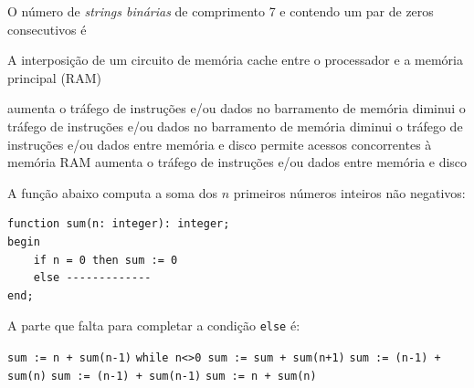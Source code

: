 \documentclass[12pt, addpoints]{exam}
\begin{document}
\begin{questions}
\question
O número de \textit{strings binárias} de comprimento 7 e contendo um par de zeros consecutivos é

\begin{choices}
\end{choices}

\question
A interposição de um circuito de memória cache entre o processador e a memória principal (RAM)
\begin{choices}
\choice aumenta o tráfego de instruções e/ou dados no barramento de memória
\choice diminui o tráfego de instruções e/ou dados no barramento de memória
\choice diminui o tráfego de instruções e/ou dados entre memória e disco
\choice permite acessos concorrentes à memória RAM
\choice aumenta o tráfego de instruções e/ou dados entre memória e disco
\end{choices}

\question
A função abaixo computa a soma dos \( n \) primeiros números inteiros não negativos:

\begin{verbatim}
function sum(n: integer): integer;
begin
    if n = 0 then sum := 0
    else -------------
end;
\end{verbatim}

A parte que falta para completar a condição \texttt{else} é:
\begin{choices}
\choice \texttt{sum := n + sum(n-1)}
\choice \texttt{while n<>0 sum := sum + sum(n+1)}
\choice \texttt{sum := (n-1) + sum(n)}
\choice \texttt{sum := (n-1) + sum(n-1)}
\choice \texttt{sum := n + sum(n)}
\end{choices}



    \end{questions}
    
\end{document}
